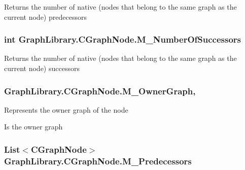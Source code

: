 Returns the number of native (nodes that belong to the same graph as the current node) predecessors 

\hypertarget{class_graph_library_1_1_c_graph_node_a1a877b0e26c037d267bcdb4eb17087ae}{}
\subsubsection[{M\+\_\+\+Number\+Of\+Successors}]{\setlength{\rightskip}{0pt plus 5cm}int Graph\+Library.\+C\+Graph\+Node.\+M\+\_\+\+Number\+Of\+Successors\hspace{0.3cm}{\ttfamily [get]}}\label{class_graph_library_1_1_c_graph_node_a1a877b0e26c037d267bcdb4eb17087ae}


Returns the number of native (nodes that belong to the same graph as the current node) successors 

\hypertarget{class_graph_library_1_1_c_graph_node_af74860380cdc7a69e9ec6634e2ccdc48}{}
\subsubsection[{M\+\_\+\+Owner\+Graph}]{ Graph\+Library.\+C\+Graph\+Node.\+M\+\_\+\+Owner\+Graph\hspace{0.3cm}{\ttfamily [get]}, {\ttfamily [set]}}\label{class_graph_library_1_1_c_graph_node_af74860380cdc7a69e9ec6634e2ccdc48}


Represents the owner graph of the node 

Is the owner graph \hypertarget{class_graph_library_1_1_c_graph_node_a428ee478ef04cd06956671a94dafdbc5}{}
\subsubsection[{M\+\_\+\+Predecessors}]{\setlength{\rightskip}{0pt plus 5cm}List$<${\bf C\+Graph\+Node}$>$ Graph\+Library.\+C\+Graph\+Node.\+M\+\_\+\+Predecessors\hspace{0.3cm}{\ttfamily [get]}}\label{class_graph_library_1_1_c_graph_node_a428ee478ef04cd06956671a94dafdbc5}



